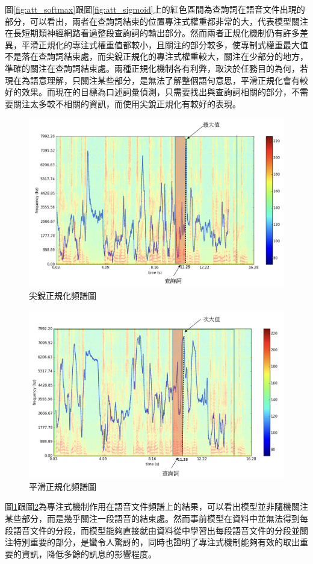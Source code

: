 \begin{itemize}
圖\ref{fig:att_softmax}跟圖\ref{fig:att_sigmoid}上的紅色區間為查詢詞在語音文件出現的部分，可以看出，兩者在查詢詞結束的位置專注式權重都非常的大，代表模型關注在長短期類神經網路看過整段查詢詞的輸出部分。然而兩者正規化機制仍有許多差異，平滑正規化的專注式權重值都較小，且關注的部分較多，使專制式權重最大值不是落在查詢詞結束處，而尖銳正規化的專注式權重較大，關注在少部分的地方，準確的關注在查詢詞結束處。兩種正規化機制各有利弊，取決於任務目的為何，若現在為語意理解，只關注某些部分，是無法了解整個語句意思，平滑正規化會有較好的效果。而現在的目標為口述詞彙偵測，只需要找出與查詢詞相關的部分，不需要關注太多較不相關的資訊，而使用尖銳正規化有較好的表現。
\begin{figure}[h]
\centering
\includegraphics[scale=0.5]{images/ch4_softmax_spec.png} 
\caption{尖銳正規化頻譜圖}
\label{fig:spec_softmax}
\end{figure}

\begin{figure}[h]
\centering
\includegraphics[scale=0.5]{images/ch4_sigmoid_spec.png} 
\caption{平滑正規化頻譜圖}
\label{fig:spec_sigmoid}
\end{figure}
圖\ref{fig:spec_softmax}跟圖\ref{fig:spec_sigmoid}為專注式機制作用在語音文件頻譜上的結果，可以看出模型並非隨機關注某些部分，而是幾乎關注一段語音的結束處。然而事前模型在資料中並無法得到每段語音文件的分段，而模型能夠直接就由資料從中學習出每段語音文件的分段並關注特別重要的部分，是蠻令人驚訝的，同時也證明了專注式機制能夠有效的取出重要的資訊，降低多餘的訊息的影響程度。
\end{itemize}
